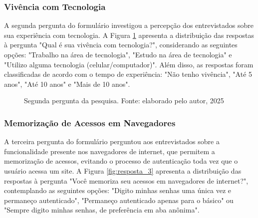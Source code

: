 \documentclass[12pt]{article}
\begin{document}
\subsubsection{Vivência com Tecnologia}

A segunda pergunta do formulário investigou a percepção dos entrevistados sobre sua
experiência com tecnologia.
A Figura \ref{fig:resposta_2} apresenta a distribuição das respostas à pergunta
"Qual é sua vivência com tecnologia?", considerando as seguintes opções:
"Trabalho na área de tecnologia", "Estudo na área de tecnologia" e "Utilizo alguma
tecnologia (celular/computador)".
Além disso, as respostas foram classificadas de acordo com o tempo de experiência:
"Não tenho vivência", "Até 5 anos", "Até 10 anos" e "Mais de 10 anos".

\begin{figure}[htb]
    \centering
  \caption{Segunda pergunta da pesquisa. Fonte: elaborado pelo autor, 2025}
  \label{fig:resposta_2}
\end{figure}
\FloatBarrier

\subsubsection{Memorização de Acessos em Navegadores}

A terceira pergunta do formulário perguntou aos entrevistados sobre a funcionalidade
presente nos navegadores de internet, que permitem a memorização de acessos, evitando
o processo de autenticação toda vez que o usuário acessa um site.
A Figura \ref{fig:resposta_3} apresenta a distribuição das respostas à pergunta "Você
memoriza seu acessos em navegadores de internet?", contemplando as seguintes opções:
"Digito minhas senhas uma única vez e permaneço autenticado", "Permaneço autenticado
apenas para o básico" ou "Sempre digito minhas senhas, de preferência em aba anônima".
\end{document}
